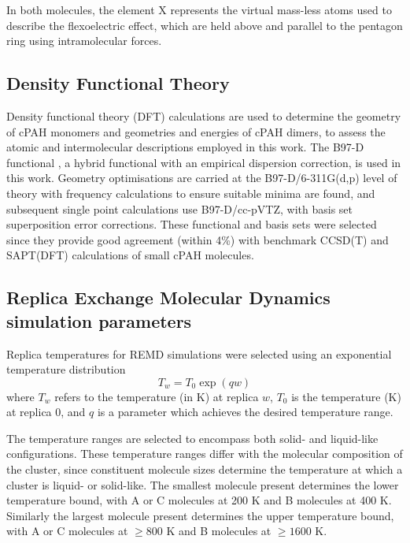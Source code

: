 In both molecules, the element X represents the virtual mass-less atoms used to describe the flexoelectric effect, which are held above and parallel to the pentagon ring using intramolecular forces.

\subsection{Density Functional Theory}
\label{secSI:DFT}
Density functional theory (DFT) calculations are used to determine the geometry of cPAH monomers and geometries and energies of cPAH dimers, to assess the atomic and intermolecular descriptions employed in this work. The B97-D functional \cite{grimme2006semiempirical}, a hybrid functional with an empirical dispersion correction, is used in this work. Geometry optimisations are carried at the B97-D/6-311G(d,p) level of theory with frequency calculations to ensure suitable minima are found, and subsequent single point calculations use B97-D/cc-pVTZ, with basis set superposition error corrections.  These functional and basis sets were selected since they provide good agreement (within 4\%) with benchmark CCSD(T) \cite{janowski2011convex} and SAPT(DFT) \cite{Cabaleiro-Lago2018} calculations of small cPAH molecules.

\subsection{Replica Exchange Molecular Dynamics simulation parameters}
\label{secSI:REMDtemps}
%
Replica temperatures for REMD simulations were selected using an exponential temperature distribution
\begin{equation}
\label{eqn:replica_temp_dist}
T_{w} = T_{0}\exp(qw)
\end{equation}
where $T_w$ refers to the temperature (in K) at replica $w$, $T_0$ is the temperature (K) at replica $0$, and $q$ is a parameter which achieves the desired temperature range. 

The temperature ranges are selected to encompass both solid- and liquid-like configurations. These temperature ranges differ with the molecular composition of the cluster, since constituent molecule sizes determine the temperature at which a cluster is liquid- or solid-like. The smallest molecule present determines the lower temperature bound, with A or C molecules at 200 K and B molecules at 400 K. Similarly the largest molecule present determines the upper temperature bound, with A or C molecules at $\ge 800$ K and B molecules at $\ge 1600$ K. 

